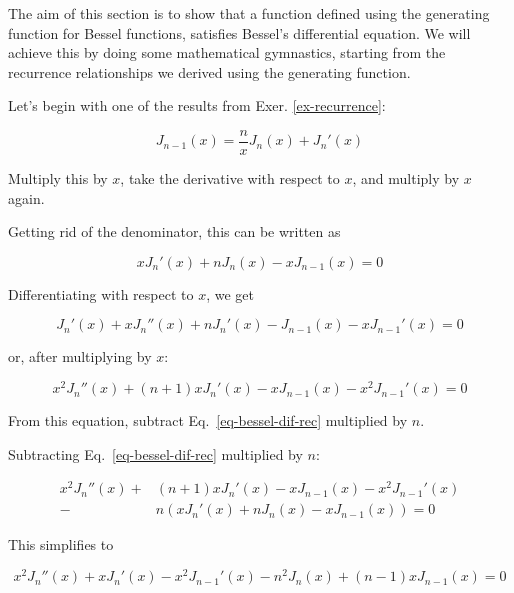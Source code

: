 The aim of this section is to show that a function defined using the generating function for Bessel functions, satisfies Bessel's differential equation. We will achieve this by doing some mathematical gymnastics, starting from the recurrence relationships we derived using the generating function.

Let's begin with one of the results from Exer. \ref{ex-recurrence}:

\begin{equation}
J_{n-1}(x) = \frac{n}{x}J_n(x) + J_n'(x)
\end{equation}

\begin{cue}
Multiply this by $x$, take the derivative with respect to $x$, and multiply by $x$ again.
\end{cue}

Getting rid of the denominator, this can be written as

\begin{equation}
x J_n'(x) + n J_n(x) - x J_{n-1}(x) = 0 \label{eq-bessel-dif-rec}
\end{equation} 

Differentiating with respect to $x$, we get

\begin{equation}
J_n'(x) + x J_n''(x) + n J_n'(x) - J_{n-1}(x) - x J_{n-1}'(x)= 0
\end{equation} 

or, after multiplying by $x$:

\begin{equation}
x^2 J_n''(x) + (n + 1) x J_n'(x) - x J_{n-1}(x) - x^2 J_{n-1}'(x)= 0
\end{equation} 

\begin{cue}
From this equation, subtract Eq.~\ref{eq-bessel-dif-rec} multiplied by $n$.
\end{cue}

Subtracting Eq.~\ref{eq-bessel-dif-rec} multiplied by $n$:

\begin{align}
x^2 J_n''(x) +& (n + 1) x J_n'(x) - x J_{n-1}(x) - x^2 J_{n-1}'(x) \nonumber \\-& n\left(x J_n'(x) + n J_n(x) - x J_{n-1}(x)\right)= 0
\end{align} 

This simplifies to

\begin{equation}
x^2 J_n''(x) +  x J_n'(x) - x^2 J_{n-1}'(x) - n^2 J_n(x) + (n - 1) x J_{n-1}(x)= 0 \label{eq-bessel-dif-rec-2}
\end{equation} 

